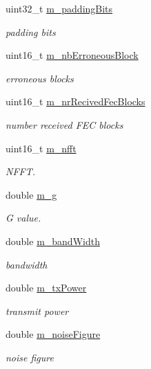 \begin{DoxyCompactItemize}
uint32\+\_\+t \hyperlink{classns3_1_1SimpleOfdmWimaxPhy_ae06e32aa0737ae886a97e364b0c56de1}{m\+\_\+padding\+Bits}
\begin{DoxyCompactList}\small\item\em padding bits \end{DoxyCompactList}\item 
uint16\+\_\+t \hyperlink{classns3_1_1SimpleOfdmWimaxPhy_a37b3fc2bee36032b02ca5a9eac9974e9}{m\+\_\+nb\+Erroneous\+Block}
\begin{DoxyCompactList}\small\item\em erroneous blocks \end{DoxyCompactList}\item 
uint16\+\_\+t \hyperlink{classns3_1_1SimpleOfdmWimaxPhy_a5f5e1bd7475a9cbb57bf56d30b91c651}{m\+\_\+nr\+Recived\+Fec\+Blocks}
\begin{DoxyCompactList}\small\item\em number received F\+EC blocks \end{DoxyCompactList}\item 
uint16\+\_\+t \hyperlink{classns3_1_1SimpleOfdmWimaxPhy_aa58e09f6c29e279d8ca9f898305e05dc}{m\+\_\+nfft}
\begin{DoxyCompactList}\small\item\em N\+F\+FT. \end{DoxyCompactList}\item 
double \hyperlink{classns3_1_1SimpleOfdmWimaxPhy_a501cb2246de395d3cad20931fe1d762a}{m\+\_\+g}
\begin{DoxyCompactList}\small\item\em G value. \end{DoxyCompactList}\item 
double \hyperlink{classns3_1_1SimpleOfdmWimaxPhy_a93298d46f3eabf4ba88bcaf7b1484917}{m\+\_\+band\+Width}
\begin{DoxyCompactList}\small\item\em bandwidth \end{DoxyCompactList}\item 
double \hyperlink{classns3_1_1SimpleOfdmWimaxPhy_a125a367d9d6b859d95df1fd2d964ed23}{m\+\_\+tx\+Power}
\begin{DoxyCompactList}\small\item\em transmit power \end{DoxyCompactList}\item 
double \hyperlink{classns3_1_1SimpleOfdmWimaxPhy_a6575ae6a549ba1fde4ef735ae63abf78}{m\+\_\+noise\+Figure}
\begin{DoxyCompactList}\small\item\em noise figure \end{DoxyCompactList}\item 

\end{DoxyCompactItemize}
